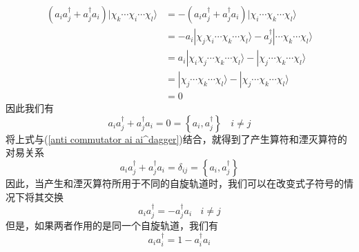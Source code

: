 \documentclass[12pt,a4paper,openany,twoside]{book}
\numberwithin{equation}{section}
\begin{document}
          \begin{equation}
            \begin{aligned}
              \left(a_{i} a_{j}^{\dagger}+a_{j}^{\dagger} a_{i}\right) | \chi_{k} \cdots \chi_{i} \cdots \chi_{l} \rangle &=-\left(a_{i} a_{j}^{\dagger}+a_{j}^{\dagger} a_{i}\right) | \chi_{i} \cdots \chi_{k} \cdots \chi_{l} \rangle \\
              &=-a_{i} | \chi_{j} \chi_{i} \cdots \chi_{k} \cdots \chi_{l} \rangle-a_{j}^{\dagger} | \cdots \chi_{k} \cdots \chi_{l} \rangle \\
              &=a_{i} | \chi_{i} \chi_{j} \cdots \chi_{k} \cdots \chi_{l} \rangle-| \chi_{j} \cdots \chi_{k} \cdots \chi_{l} \rangle \\
              &=| \chi_{j} \cdots \chi_{k} \cdots \chi_{l} \rangle-| \chi_{j} \cdots \chi_{k} \cdots \chi_{l} \rangle \\
              &=0
            \end{aligned}
          \end{equation}
          因此我们有
          \begin{equation}
            a_i a_j^\dagger+a_j^\dagger a_i=0=\left\{a_i,a_j^\dagger\right\}\ \ \ \ i\neq j
          \end{equation}
          将上式与(\ref{anti commutator ai ai^dagger})结合，就得到了产生算符和湮灭算符的对易关系
          \begin{equation}
            a_i a_j^\dagger+a_j^\dagger a_i=\delta_{ij}=\left\{a_i,a_j^\dagger\right\}
            \label{anti commutator creation and annihilation}
          \end{equation}
          因此，当产生和湮灭算符所用于不同的自旋轨道时，我们可以在改变式子符号的情况下将其交换
          \begin{equation}
            a_i a_j^\dagger=-a_j^\dagger a_i \ \ \ \ i\neq j
          \end{equation}
          但是，如果两者作用的是同一个自旋轨道，我们有
          \begin{equation}
            a_i a_i^\dagger=1-a_i^\dagger a_i
          \end{equation}
          
\end{document}
